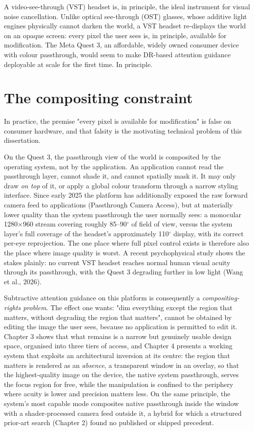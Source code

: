 A video-see-through (VST) headset is, in principle, the ideal instrument for visual noise
cancellation. Unlike optical see-through (OST) glasses, whose additive light engines physically
cannot darken the world, a VST headset re-displays the world on an opaque screen: every pixel the
user sees is, in principle, available for modification. The Meta Quest 3, an affordable, widely
owned consumer device with colour passthrough, would seem to make DR-based attention guidance
deployable at scale for the first time. In principle.

\section{The compositing constraint}

In practice, the premise "every pixel is available for modification" is false on consumer hardware,
and that falsity is the motivating technical problem of this dissertation.

On the Quest 3, the passthrough view of the world is composited by the operating system, not by the
application. An application cannot read the passthrough layer, cannot shade it, and cannot spatially
mask it. It may only draw \textit{on top} of it, or apply a global colour transform through a narrow styling
interface. Since early 2025 the platform has additionally exposed the raw forward camera feed to
applications (Passthrough Camera Access), but at materially lower quality than the system passthrough
the user normally sees: a monocular 1280$\times$960 stream covering roughly 85–90$^{\circ}$ of field of view, versus
the system layer's full coverage of the headset's approximately 110$^{\circ}$ display, with its correct
per-eye reprojection. The one place where full pixel control exists is therefore also the place where
image quality is worst. A recent psychophysical study shows the stakes plainly: no current VST
headset reaches normal human visual acuity through its passthrough, with the Quest 3 degrading
further in low light (Wang et al., 2026).

Subtractive attention guidance on this platform is consequently a \textit{compositing-rights problem}. The
effect one wants: "dim everything except the region that matters, without degrading the region that
matters", cannot be obtained by editing the image the user sees, because no application is permitted
to edit it. Chapter 3 shows that what remains is a narrow but genuinely usable design space, organised
into three tiers of access, and Chapter 4 presents a working system that exploits an architectural
inversion at its centre: the region that matters is rendered as an \textit{absence},  a transparent window
in an overlay, so that the highest-quality image on the device, the native system passthrough,
serves the focus region for free, while the manipulation is confined to the periphery where acuity is
lower and precision matters less. On the same principle, the system's most capable mode composites
native passthrough inside the window with a shader-processed camera feed outside it, a hybrid for
which a structured prior-art search (Chapter 2) found no published or shipped precedent.

